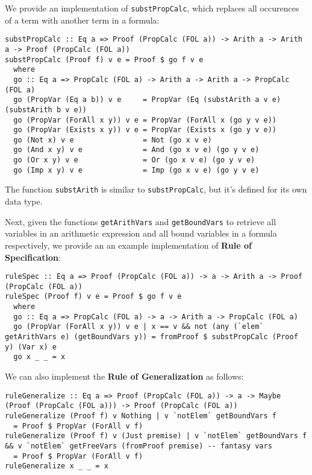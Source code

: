 \documentclass{article}
\begin{document}
We provide an implementation of \texttt{substPropCalc}, which replaces all occurences of a term with another term in a formula:

\begin{lstlisting}
substPropCalc :: Eq a => Proof (PropCalc (FOL a)) -> Arith a -> Arith a -> Proof (PropCalc (FOL a))
substPropCalc (Proof f) v e = Proof $ go f v e
  where
  go :: Eq a => PropCalc (FOL a) -> Arith a -> Arith a -> PropCalc (FOL a)
  go (PropVar (Eq a b)) v e     = PropVar (Eq (substArith a v e) (substArith b v e))
  go (PropVar (ForAll x y)) v e = PropVar (ForAll x (go y v e))
  go (PropVar (Exists x y)) v e = PropVar (Exists x (go y v e))
  go (Not x) v e                = Not (go x v e)
  go (And x y) v e              = And (go x v e) (go y v e)
  go (Or x y) v e               = Or (go x v e) (go y v e)
  go (Imp x y) v e              = Imp (go x v e) (go y v e)
\end{lstlisting}

The function \texttt{substArith} is similar to \texttt{substPropCalc}, but it's defined for its own data type.

Next, given the functions \texttt{getArithVars} and \texttt{getBoundVars} to retrieve all variables in an arithmetic expression and all bound variables in a formula respectively, we provide an an example implementation of \textbf{Rule of Specification}:

\begin{lstlisting}
ruleSpec :: Eq a => Proof (PropCalc (FOL a)) -> a -> Arith a -> Proof (PropCalc (FOL a))
ruleSpec (Proof f) v e = Proof $ go f v e
  where
  go :: Eq a => PropCalc (FOL a) -> a -> Arith a -> PropCalc (FOL a)
  go (PropVar (ForAll x y)) v e | x == v && not (any (`elem` getArithVars e) (getBoundVars y)) = fromProof $ substPropCalc (Proof y) (Var x) e
  go x _ _ = x
\end{lstlisting}

We can also implement the \textbf{Rule of Generalization} as follows:

\begin{lstlisting}
ruleGeneralize :: Eq a => Proof (PropCalc (FOL a)) -> a -> Maybe (Proof (PropCalc (FOL a))) -> Proof (PropCalc (FOL a))
ruleGeneralize (Proof f) v Nothing | v `notElem` getBoundVars f
  = Proof $ PropVar (ForAll v f)
ruleGeneralize (Proof f) v (Just premise) | v `notElem` getBoundVars f && v `notElem` getFreeVars (fromProof premise) -- fantasy vars
  = Proof $ PropVar (ForAll v f)
ruleGeneralize x _ _ = x
\end{lstlisting}
\end{document}
